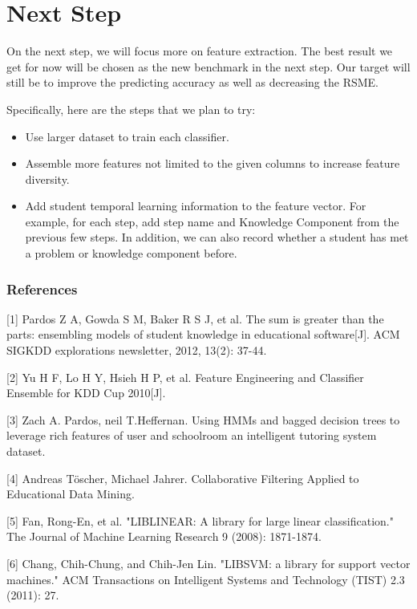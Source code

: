 \documentclass{article} %
\begin{document}
\section{Next Step}
On the next step, we will focus more on feature extraction. The best result we get for now will be chosen as the new benchmark in the next step. Our target will still be to improve the predicting accuracy as well as decreasing the RSME.

Specifically, here are the steps that we plan to try:
\begin{itemize}
\item Use larger dataset to train each classifier.
\item Assemble more features not limited to the given columns to increase feature diversity.
\item Add student temporal learning information to the feature vector. For example, for each step, add step name and Knowledge Component from the previous few steps. In addition, we can also record whether a student has met a problem or knowledge component before.
\end{itemize}

\subsubsection*{References}
\small{
[1] Pardos Z A, Gowda S M, Baker R S J, et al. The sum is greater than the parts: ensembling models of student knowledge in educational software[J]. ACM SIGKDD explorations newsletter, 2012, 13(2): 37-44.

[2] Yu H F, Lo H Y, Hsieh H P, et al. Feature Engineering and Classifier Ensemble for KDD Cup 2010[J].

[3] Zach A. Pardos, neil T.Heffernan. Using HMMs and bagged decision trees to leverage rich features of user and schoolroom an intelligent tutoring system dataset. 

[4] Andreas T\"{o}scher, Michael Jahrer. Collaborative Filtering Applied to Educational Data Mining.

[5] Fan, Rong-En, et al. "LIBLINEAR: A library for large linear classification." The Journal of Machine Learning Research 9 (2008): 1871-1874.

[6] Chang, Chih-Chung, and Chih-Jen Lin. "LIBSVM: a library for support vector machines." ACM Transactions on Intelligent Systems and Technology (TIST) 2.3 (2011): 27.


}
\end{document}
